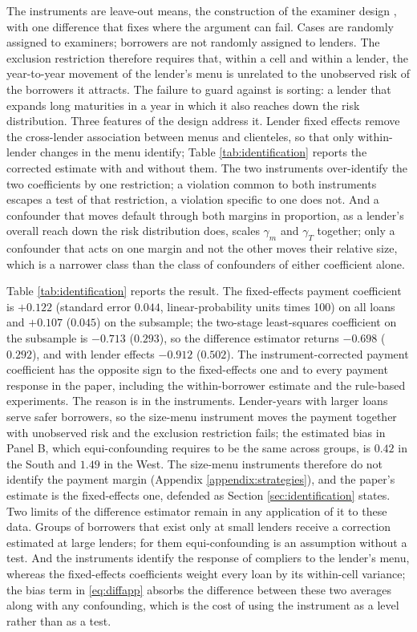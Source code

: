 The instruments are leave-out means, the construction of the examiner design \citep{kling_incarceration_2006, dobbie_targeted_2020}, with one difference that fixes where the argument can fail. Cases are randomly assigned to examiners; borrowers are not randomly assigned to lenders. The exclusion restriction therefore requires that, within a cell and within a lender, the year-to-year movement of the lender's menu is unrelated to the unobserved risk of the borrowers it attracts. The failure to guard against is sorting: a lender that expands long maturities in a year in which it also reaches down the risk distribution. Three features of the design address it. Lender fixed effects remove the cross-lender association between menus and clienteles, so that only within-lender changes in the menu identify; Table \ref{tab:identification} reports the corrected estimate with and without them. The two instruments over-identify the two coefficients by one restriction; a violation common to both instruments escapes a test of that restriction, a violation specific to one does not. And a confounder that moves default through both margins in proportion, as a lender's overall reach down the risk distribution does, scales $\gamma_m$ and $\gamma_T$ together; only a confounder that acts on one margin and not the other moves their relative size, which is a narrower class than the class of confounders of either coefficient alone.

Table \ref{tab:identification} reports the result. The fixed-effects payment coefficient is $+0.122$ (standard error $0.044$, linear-probability units times 100) on all loans and $+0.107$ ($0.045$) on the subsample; the two-stage least-squares coefficient on the subsample is $-0.713$ ($0.293$), so the difference estimator returns $-0.698$ ($0.292$), and with lender effects $-0.912$ ($0.502$). The instrument-corrected payment coefficient has the opposite sign to the fixed-effects one and to every payment response in the paper, including the within-borrower estimate and the rule-based experiments. The reason is in the instruments. Lender-years with larger loans serve safer borrowers, so the size-menu instrument moves the payment together with unobserved risk and the exclusion restriction fails; the estimated bias in Panel B, which equi-confounding requires to be the same across groups, is $0.42$ in the South and $1.49$ in the West. The size-menu instruments therefore do not identify the payment margin (Appendix \ref{appendix:strategies}), and the paper's estimate is the fixed-effects one, defended as Section \ref{sec:identification} states. Two limits of the difference estimator remain in any application of it to these data. Groups of borrowers that exist only at small lenders receive a correction estimated at large lenders; for them equi-confounding is an assumption without a test. And the instruments identify the response of compliers to the lender's menu, whereas the fixed-effects coefficients weight every loan by its within-cell variance; the bias term in \eqref{eq:diffapp} absorbs the difference between these two averages along with any confounding, which is the cost of using the instrument as a level rather than as a test.


